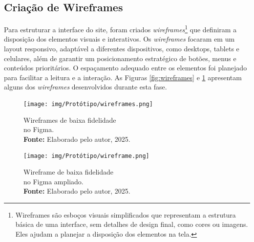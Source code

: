 \subsection{Criação de Wireframes}
Para estruturar a interface do site, foram criados \textit{wireframes}\footnote{Wireframes são esboços visuais simplificados que representam a estrutura básica de uma interface, sem detalhes de design final, como cores ou imagens. Eles ajudam a planejar a disposição dos elementos na tela.} que definiram a disposição dos elementos visuais e interativos. Os \textit{wireframes} focaram em um layout responsivo, adaptável a diferentes dispositivos, como desktops, tablets e celulares, além de garantir um posicionamento estratégico de botões, menus e conteúdos prioritários. O espaçamento adequado entre os elementos foi planejado para facilitar a leitura e a interação. As Figuras \ref{fig:wireframes} e \ref{fig:wireframe} apresentam alguns dos \textit{wireframes} desenvolvidos durante esta fase.


\begin{figure}[H]
    \centering
    \begin{minipage}[b]{0.48\textwidth}
        \centering
        \texttt{[image: img/Protótipo/wireframes.png]}
        \caption{Wireframes de baixa fidelidade \\no Figma. \\
            \textbf{Fonte:} Elaborado pelo autor, 2025.}
        \label{fig:wireframes}
    \end{minipage}
    \hfill
    \begin{minipage}[b]{0.48\textwidth}
        \centering
        \texttt{[image: img/Protótipo/wireframe.png]}
        \caption{Wireframe de baixa fidelidade\\ no Figma ampliado. \\
            \textbf{Fonte:} Elaborado pelo autor, 2025.}
        \label{fig:wireframe}
    \end{minipage}
\end{figure}



